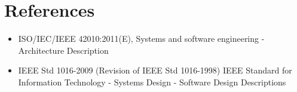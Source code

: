 \chapter*{References}
\begin{itemize}
	\item ISO/IEC/IEEE 42010:2011(E), Systems and software engineering - Architecture Description
	\item IEEE Std 1016-2009 (Revision of IEEE Std 1016-1998) IEEE Standard for Information Technology - Systems Design - Software Design Descriptions
\end{itemize}
